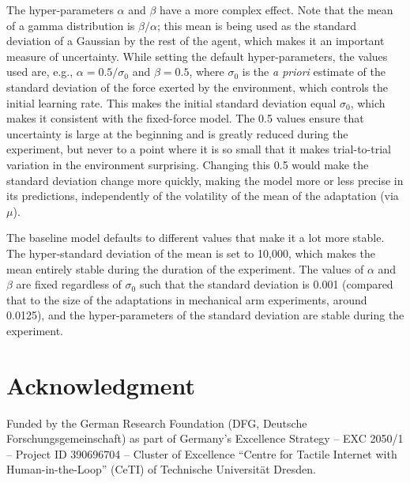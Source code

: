 \documentclass[a4paper,doc,floatsintext,natbib]{apa6}
\begin{document}
The hyper-parameters $\alpha$ and $\beta$ have a more complex effect. Note that the mean of a gamma distribution is $\beta / \alpha$; this mean is being used as the standard deviation of a Gaussian by the rest of the agent, which makes it an important measure of uncertainty. While setting the default hyper-parameters, the values used are, e.g., $\alpha = 0.5 / \sigma_0$ and $\beta = 0.5$, where $\sigma_0$ is the \textit{a priori} estimate of the standard deviation of the force exerted by the environment, which controls the initial learning rate. This makes the initial standard deviation equal $\sigma_0$, which makes it consistent with the fixed-force model. The 0.5 values ensure that uncertainty is large at the beginning and is greatly reduced during the experiment, but never to a point where it is so small that it makes trial-to-trial variation in the environment surprising. Changing this 0.5 would make the standard deviation change more quickly, making the model more or less precise in its predictions, independently of the volatility of the mean of the adaptation (via $\mu$).

The baseline model defaults to different values that make it a lot more stable. The hyper-standard deviation of the mean is set to 10,000, which makes the mean entirely stable during the duration of the experiment. The values of $\alpha$ and $\beta$ are fixed regardless of $\sigma_0$ such that the standard deviation is 0.001 (compared that to the size of the adaptations in mechanical arm experiments, around 0.0125), and the hyper-parameters of the standard deviation are stable during the experiment.


\section{Acknowledgment}
Funded by the German Research Foundation (DFG, Deutsche Forschungsgemeinschaft) as part of Germany’s Excellence Strategy – EXC 2050/1 – Project ID 390696704 – Cluster of Excellence “Centre for Tactile Internet with Human-in-the-Loop” (CeTI) of Technische Universität Dresden.


\end{document}
